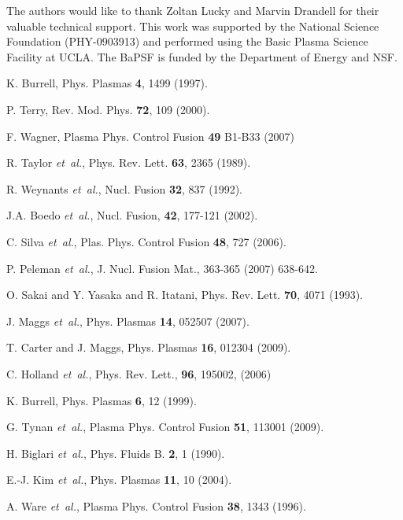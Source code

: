 \documentclass[aps,prl,amsmath,amssymb,preprint,superscriptaddress]{revtex4} %
\begin{document}
The authors would like to thank Zoltan Lucky and Marvin Drandell for their valuable technical support.  This work
was supported by the National Science Foundation (PHY-0903913) and performed using the Basic Plasma Science Facility at UCLA. The BaPSF is funded by the
Department of Energy and NSF.


\providecommand{\noopsort}[1]{}\providecommand{\singleletter}[1]{#1}%
\begin{thebibliography}{10}

K. Burrell, Phys. Plasmas {\bf 4},  1499  (1997).

P. Terry, Rev. Mod. Phys. {\bf 72},  109  (2000).

F. Wagner, Plasma Phys. Control Fusion {\bf 49} B1-B33 (2007)


R. Taylor {\it et~al.}, Phys. Rev. Lett. {\bf 63},  2365  (1989).

R. Weynants {\it et~al.}, Nucl. Fusion {\bf 32},  837  (1992).

J.A. Boedo {\it et~al.}, Nucl. Fusion, {\bf 42}, 177-121 (2002).


C. Silva {\it et~al.}, Plas. Phys. Control Fusion {\bf 48},  727  (2006).


P. Peleman {\it et~al.}, J. Nucl. Fusion Mat., 363-365 (2007) 638-642.


O. Sakai and Y. Yasaka and R. Itatani, Phys. Rev. Lett. {\bf 70},  4071 (1993).

J. Maggs {\it et~al.}, Phys. Plasmas {\bf 14},  052507  (2007).

T. Carter and J. Maggs, Phys. Plasmas {\bf 16},  012304  (2009).

C. Holland {\it et~al.}, Phys. Rev. Lett., {\bf 96}, 195002, (2006)


K. Burrell, Phys. Plasmas {\bf 6},  12  (1999).

G. Tynan {\it et~al.}, Plasma Phys. Control Fusion {\bf 51}, 113001  (2009).

H. Biglari {\it et~al.}, Phys. Fluids B. {\bf 2},  1  (1990).

E.-J. Kim {\it et~al.}, Phys. Plasmas {\bf 11},  10  (2004).

A. Ware {\it et~al.}, Plasma Phys. Control Fusion
  {\bf 38},  1343  (1996).


\end{thebibliography}
\end{document}
